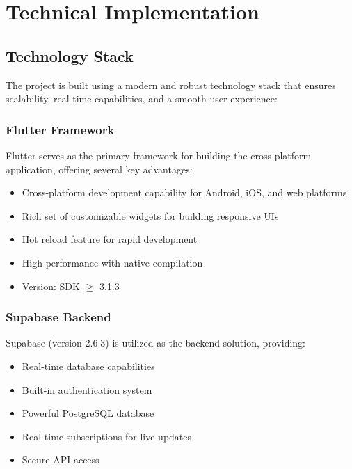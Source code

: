 \section{Technical Implementation}

\subsection{Technology Stack}
The project is built using a modern and robust technology stack that ensures scalability, real-time capabilities, and a smooth user experience:

\subsubsection{Flutter Framework}
Flutter serves as the primary framework for building the cross-platform application, offering several key advantages:
\begin{itemize}
    \item Cross-platform development capability for Android, iOS, and web platforms
    \item Rich set of customizable widgets for building responsive UIs
    \item Hot reload feature for rapid development
    \item High performance with native compilation
    \item Version: SDK $\geq$ 3.1.3
\end{itemize}

\subsubsection{Supabase Backend}
Supabase (version 2.6.3) is utilized as the backend solution, providing:
\begin{itemize}
    \item Real-time database capabilities
    \item Built-in authentication system
    \item Powerful PostgreSQL database
    \item Real-time subscriptions for live updates
    \item Secure API access
\end{itemize}

